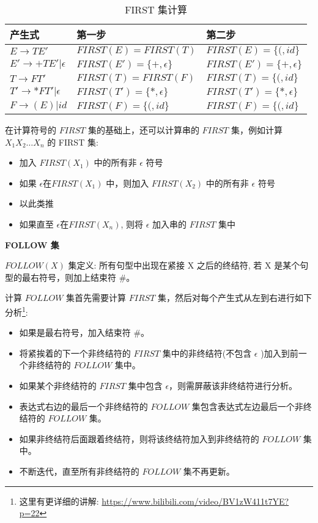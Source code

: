 \begin{table}[H]
    \centering
    \caption{FIRST 集计算}
    \label{table:FIRST 集计算}
    \setlength{\tabcolsep}{10mm}
    \begin{tabular}{l|l|l}
        \toprule
        \textbf{产生式}               & \textbf{第一步}            & \textbf{第二步}            \\
        \midrule
        $E\rightarrow TE'$            & $FIRST(E)=FIRST(T)$        & $FIRST(E)=\{(,id\}$        \\
        $E'\rightarrow+ TE'|\epsilon$ & $FIRST(E')=\{+,\epsilon\}$ & $FIRST(E')=\{+,\epsilon\}$ \\
        $T\rightarrow FT'$            & $FIRST(T)=FIRST(F)$        & $FIRST(T)=\{(,id\}$        \\
        $T'\rightarrow *FT'|\epsilon$ & $FIRST(T')=\{*,\epsilon\}$ & $FIRST(T')=\{*,\epsilon\}$ \\
        $F\rightarrow (E)|id$         & $FIRST(F)=\{(,id\}$        & $FIRST(F)=\{(,id\}$        \\
        \bottomrule
    \end{tabular}
\end{table}

在计算符号的 $FIRST$ 集的基础上，还可以计算串的 $FIRST$ 集，例如计算 $X_1 X_2 \dots X_n$ 的 FIRST 集:
\begin{itemize}
    \item 加入 $FIRST(X_1)$ 中的所有非 $\epsilon$ 符号
    \item 如果 $\epsilon$在$FIRST(X_1)$ 中，则加入 $FIRST(X_2)$ 中的所有非 $\epsilon$ 符号
    \item 以此类推
    \item 如果直至 $\epsilon$在$FIRST(X_n)$, 则将 $\epsilon$ 加入串的 $FIRST$ 集中
\end{itemize}

\noindent\textbf{FOLLOW 集}

$FOLLOW(X)$ 集定义: 所有句型中出现在紧接 X 之后的终结符, 若 X 是某个句型的最右符号，则加上结束符 \#。

计算 $FOLLOW$ 集首先需要计算 $FIRST$ 集，然后对每个产生式从左到右进行如下分析\footnote{这里有更详细的讲解: \url{https://www.bilibili.com/video/BV1zW411t7YE?p=22}}:
\begin{itemize}
    \item 如果是最右符号，加入结束符 \#。
    \item 将紧挨着的下一个非终结符的 $FIRST$ 集中的非终结符(不包含 $\epsilon$ )加入到前一个非终结符的 $FOLLOW$ 集中。
    \item 如果某个非终结符的 $FIRST$ 集中包含 $\epsilon$，则需屏蔽该非终结符进行分析。
    \item 表达式右边的最后一个非终结符的 $FOLLOW$ 集包含表达式左边最后一个非终结符的 $FOLLOW$ 集。
    \item 如果非终结符后面跟着终结符，则将该终结符加入到非终结符的 $FOLLOW$ 集中。
    \item 不断迭代，直至所有非终结符的 $FOLLOW$ 集不再更新。
\end{itemize}

